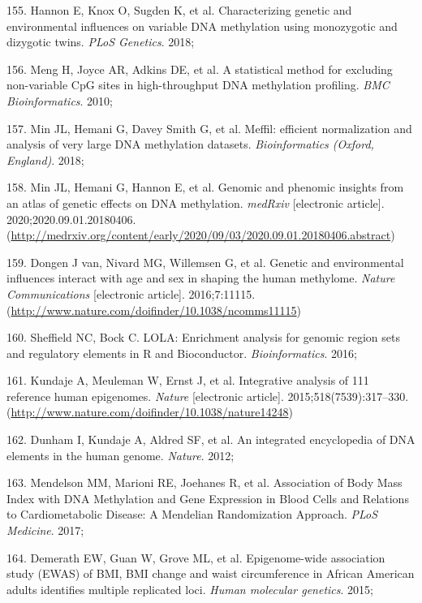 \documentclass[11pt,oneside]{bristolthesis}
\newenvironment{cslreferences}%
  {}%
  {\par}
\begin{document}
\begin{cslreferences}
\leavevmode\hypertarget{ref-Hannon2018}{}%
155. Hannon E, Knox O, Sugden K, et al. Characterizing genetic and environmental influences on variable DNA methylation using monozygotic and dizygotic twins. \emph{PLoS Genetics}. 2018;

\leavevmode\hypertarget{ref-Meng2010}{}%
156. Meng H, Joyce AR, Adkins DE, et al. A statistical method for excluding non-variable CpG sites in high-throughput DNA methylation profiling. \emph{BMC Bioinformatics}. 2010;

\leavevmode\hypertarget{ref-Min2018}{}%
157. Min JL, Hemani G, Davey Smith G, et al. Meffil: efficient normalization and analysis of very large DNA methylation datasets. \emph{Bioinformatics (Oxford, England)}. 2018;

\leavevmode\hypertarget{ref-Min2020}{}%
158. Min JL, Hemani G, Hannon E, et al. Genomic and phenomic insights from an atlas of genetic effects on DNA methylation. \emph{medRxiv} {[}electronic article{]}. 2020;2020.09.01.20180406. (\url{http://medrxiv.org/content/early/2020/09/03/2020.09.01.20180406.abstract})

\leavevmode\hypertarget{ref-VanDongen2016}{}%
159. Dongen J van, Nivard MG, Willemsen G, et al. Genetic and environmental influences interact with age and sex in shaping the human methylome. \emph{Nature Communications} {[}electronic article{]}. 2016;7:11115. (\url{http://www.nature.com/doifinder/10.1038/ncomms11115})

\leavevmode\hypertarget{ref-Sheffield2016}{}%
160. Sheffield NC, Bock C. LOLA: Enrichment analysis for genomic region sets and regulatory elements in R and Bioconductor. \emph{Bioinformatics}. 2016;

\leavevmode\hypertarget{ref-Kundaje2015}{}%
161. Kundaje A, Meuleman W, Ernst J, et al. Integrative analysis of 111 reference human epigenomes. \emph{Nature} {[}electronic article{]}. 2015;518(7539):317--330. (\url{http://www.nature.com/doifinder/10.1038/nature14248})

\leavevmode\hypertarget{ref-Dunham2012}{}%
162. Dunham I, Kundaje A, Aldred SF, et al. An integrated encyclopedia of DNA elements in the human genome. \emph{Nature}. 2012;

\leavevmode\hypertarget{ref-Mendelson2017}{}%
163. Mendelson MM, Marioni RE, Joehanes R, et al. Association of Body Mass Index with DNA Methylation and Gene Expression in Blood Cells and Relations to Cardiometabolic Disease: A Mendelian Randomization Approach. \emph{PLoS Medicine}. 2017;

\leavevmode\hypertarget{ref-Demerath2015}{}%
164. Demerath EW, Guan W, Grove ML, et al. Epigenome-wide association study (EWAS) of BMI, BMI change and waist circumference in African American adults identifies multiple replicated loci. \emph{Human molecular genetics}. 2015;


\end{cslreferences}
\end{document}
